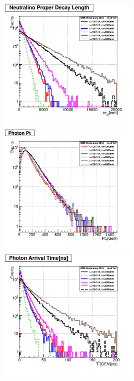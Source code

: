 {\begin{center}
{\includegraphics[height=0.5\textwidth,width=0.5\textwidth]{THESISPLOTS/GMSB-SPS8-MODEL-Neutralino-Proper-DecayLength.png}} \\
\hspace{0.5cm}
\mbox{\includegraphics[height=0.5\textwidth,width=0.5\textwidth]{THESISPLOTS/GMSB-SPS8-MODEL-Photon-Pt.png} \hspace{-1cm}
\includegraphics[height=0.5\textwidth,width=0.5\textwidth]{THESISPLOTS/GMSB-SPS8-MODEL-Photon-Arrival-Time.png}}
\label{fig:NKINE}
\end{center}



}
